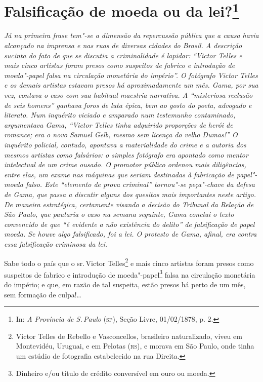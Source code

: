 \chapter{Falsificação de moeda ou da lei?\footnote[*]{In: \emph{A
  Província de S.\,Paulo} (\textsc{sp}), Seção Livre, 01/02/1878, p. 2.}}

\begin{flushleft}
{\footnotesize\itshape
Já na primeira frase tem"-se a dimensão da repercussão pública que a causa
havia alcançado na imprensa e nas ruas de diversas cidades do Brasil. A
descrição sucinta do fato de que se discutia a criminalidade é lapidar:
``Victor Telles e mais cinco artistas foram presos como suspeitos de
fabrico e introdução de moeda"-papel falsa na circulação monetária do
império''. O fotógrafo Victor Telles e os demais artistas estavam presos
há aproximadamente um mês. Gama, por sua vez, contava o caso com sua
habitual maestria narrativa. A ``misteriosa reclusão de seis homens''
ganhava foros de luta épica, bem ao gosto do poeta, advogado e literato.
Num inquérito viciado e amparado num testemunho contaminado, argumentava Gama, ``Victor
Telles tinha adquirido proporções de herói de romance; era o novo Samuel
Gelb, mesmo sem licença do velho Dumas!'' O inquérito policial, contudo,
apontava a materialidade do crime e a autoria dos mesmos artistas como
falsários: o simples fotógrafo era apontado como mentor intelectual de
um crime ousado. O promotor público ordenou mais diligências, entre
elas, um exame nas máquinas que seriam destinadas à fabricação de
papel"-moeda falso. Este ``elemento de prova criminal''
tornou"-se peça"-chave da defesa de Gama, que passa a discutir alguns dos quesitos
mais importantes neste artigo. De maneira estratégica, certamente
visando a decisão do Tribunal da Relação de São Paulo, que pautaria o
caso na semana seguinte, Gama conclui o texto convencido
de que ``é evidente a não existência do delito'' de falsificação de
papel moeda. Se houve algo falsificado, foi a lei. O protesto de Gama,
afinal, era contra essa falsificação criminosa da lei. }
\end{flushleft}

Sabe todo o país que o sr.\,Victor Telles\footnote{Victor Telles de
  Rebello e Vasconcellos, brasileiro naturalizado, viveu em Montevidéu,
  Uruguai, e em Pelotas (\textsc{rs}), e morava em São Paulo, onde tinha um estúdio de
  fotografia estabelecido na rua Direita.} e mais cinco artistas foram
presos como suspeitos de fabrico e introdução de moeda"-papel\footnote{
  Dinheiro e/ou título de crédito conversível em ouro ou moeda.} falsa
na circulação monetária do império; e que, em razão de tal suspeita,
estão presos há perto de um mês, sem formação de culpa!\ldots{}

